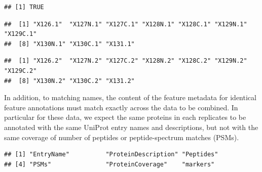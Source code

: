 \begin{verbatim}
## [1] TRUE
\end{verbatim}

\begin{Shaded}
\begin{Highlighting}[]
\StringTok{ }\NormalTok{)}
\StringTok{ }\NormalTok{)}
\end{Highlighting}
\end{Shaded}

\begin{verbatim}
##  [1] "X126.1"  "X127N.1" "X127C.1" "X128N.1" "X128C.1" "X129N.1" "X129C.1"
##  [8] "X130N.1" "X130C.1" "X131.1"
\end{verbatim}

\begin{Shaded}
\begin{Highlighting}[]
\end{Highlighting}
\end{Shaded}

\begin{verbatim}
##  [1] "X126.2"  "X127N.2" "X127C.2" "X128N.2" "X128C.2" "X129N.2" "X129C.2"
##  [8] "X130N.2" "X130C.2" "X131.2"
\end{verbatim}

In addition, to matching names, the content of the feature metadata for
identical feature annotations must match exactly across the data to be
combined. In particular for these data, we expect the same proteins in
each replicates to be annotated with the same UniProt entry names and
descriptions, but not with the same coverage of number of peptides or
peptide-spectrum matches (PSMs).

\begin{Shaded}
\begin{Highlighting}[]
\end{Highlighting}
\end{Shaded}

\begin{verbatim}
## [1] "EntryName"          "ProteinDescription" "Peptides"          
## [4] "PSMs"               "ProteinCoverage"    "markers"
\end{verbatim}

